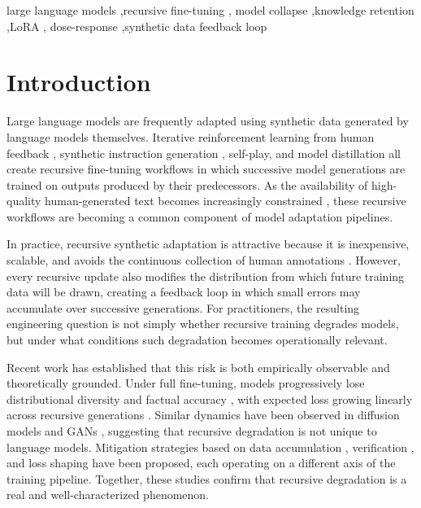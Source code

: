 \documentclass[a4paper,fleqn]{cas-dc}
\begin{document}
\begin{keywords}
large language models \sep recursive fine-tuning \sep
model collapse \sep knowledge retention \sep LoRA \sep
dose-response \sep synthetic data feedback loop
\end{keywords}

\maketitle

\section{Introduction}\label{sec:introduction}

Large language models are frequently adapted using synthetic data generated by
language models themselves. Iterative reinforcement learning from human feedback
\citep{ouyang2022training}, synthetic instruction generation
\citep{wang2023selfinstruct,taori2023alpaca}, self-play, and model distillation
all create recursive fine-tuning workflows in which successive model generations
are trained on outputs produced by their predecessors. As the availability of high-quality
human-generated text becomes increasingly constrained \citep{villalobos2024},
these recursive workflows are becoming a common component of model adaptation
pipelines.

In practice, recursive synthetic adaptation is attractive because it is
inexpensive, scalable, and avoids the continuous collection of human
annotations \citep{liu2024bestpractices}. However, every recursive update also modifies the distribution from
which future training data will be drawn, creating a feedback loop in which
small errors may accumulate over successive generations. For practitioners, the
resulting engineering question is not simply whether recursive training degrades
models, but under what conditions such degradation becomes operationally
relevant.

Recent work has established that this risk is both empirically observable and
theoretically grounded. Under full fine-tuning, models progressively lose
distributional diversity \citep{shumailov2024} and factual accuracy
\citep{keisha2025}, with expected loss growing linearly across recursive
generations \citep{dohmatob2025}. Similar dynamics have been observed in
diffusion models and GANs \citep{alemohammad2024}, suggesting that recursive
degradation is not unique to language models. Mitigation strategies based on
data accumulation \citep{gerstgrasser2024}, verification \citep{yi2025}, and
loss shaping \citep{zibakhsh2024} have been proposed, each operating on a
different axis of the training pipeline. Together, these studies confirm that
recursive degradation is a real and well-characterized phenomenon.
\end{document}
